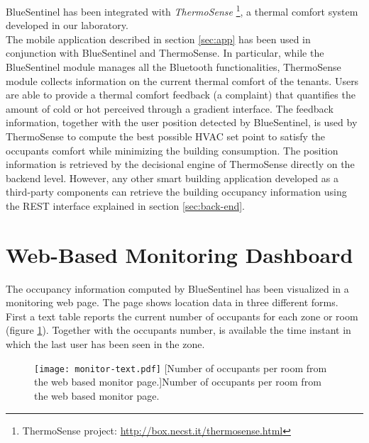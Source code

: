 BlueSentinel has been integrated with \emph{ThermoSense}
\footnote{ThermoSense project: \url{http://box.necst.it/thermosense.html}}, a thermal comfort system developed in our laboratory.\\
The mobile application described in section \ref{sec:app} has been used in conjunction with BlueSentinel and ThermoSense. In particular, while the BlueSentinel module manages all the Bluetooth functionalities, ThermoSense module collects information on the current thermal comfort of the tenants. Users are able to provide a thermal comfort feedback (a complaint) that quantifies the amount of cold or hot perceived through a gradient interface. The feedback information, together with the user position detected by BlueSentinel, is used by ThermoSense to compute the best possible HVAC set point to satisfy the occupants comfort while minimizing the building consumption.
The position information is retrieved by the decisional engine of ThermoSense directly on the backend level. However, any other smart building application developed as a third-party components can retrieve the building occupancy information using the REST interface explained in section \ref{sec:back-end}.


\section{Web-Based Monitoring Dashboard}
\label{sec:webmonitor}
The occupancy information computed by BlueSentinel has been visualized in a monitoring web page. The page shows location data in three different forms.\\
First a text table reports the current number of occupants for each zone or room (figure \ref{fig:monitor-text}). Together with the occupants number, is available the time instant in which the last user has been seen in the zone.

\begin{figure}[h!tb]
\center
\texttt{[image: monitor-text.pdf]}
[Number of occupants per room from the web based monitor page.]{Number of occupants per room from the web based monitor page.}
\label{fig:monitor-text}
\end{figure}

